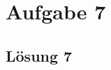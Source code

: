 \documentclass[main.tex]{subfiles}
\begin{document}
\section{Aufgabe 7}

\subsection{Lösung 7}
\end{document}
